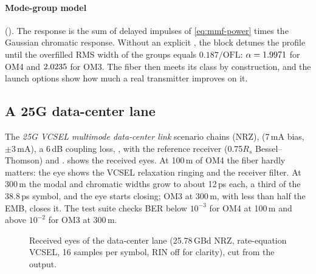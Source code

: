 \paragraph{Mode-group model} (). The response is the sum of delayed
impulses of \cref{eq:mmf-power} times the Gaussian chromatic response. Without an explicit
, the block detunes the profile until the overfilled RMS width of the groups equals
$0.187/\mathrm{OFL}$: $\alpha=1.9971$ for OM4 and $2.0235$ for OM3. The fiber then meets its class by
construction, and the launch options show how much a real transmitter improves on it.

\subsection{A 25G data-center lane}
The \emph{25G VCSEL multimode data-center link} scenario chains  (NRZ),
 (7\,mA bias, $\pm3$\,mA), a 6\,dB coupling loss, ,  with
the reference receiver (0.75$R_s$ Bessel--Thomson) and .  shows the
received eyes. At 100\,m of OM4 the fiber hardly matters: the eye shows the VCSEL relaxation
ringing and the receiver filter. At 300\,m the modal and chromatic widths grow to about 12\,ps each,
a third of the 38.8\,ps symbol, and the eye starts closing; OM3 at 300\,m, with less than half the
EMB, closes it. The test suite checks BER below $10^{-3}$ for OM4 at 100\,m and above $10^{-2}$ for OM3 at
300\,m.

\begin{figure}[htbp]
\centering
{}
\caption{Received eyes of the data-center lane (25.78\,GBd NRZ, rate-equation VCSEL, 16 samples per
symbol, RIN off for clarity), cut from the  output.}
\label{fig:mmf-eyes}
\end{figure}

